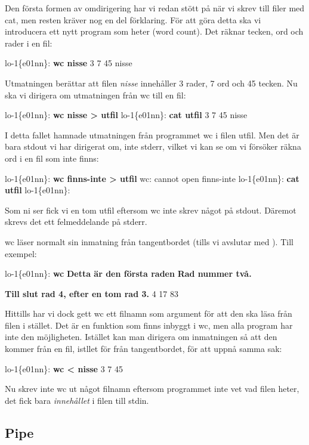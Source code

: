 \documentclass[a4paper,twocolumn]{book}
\begin{document}
Den första formen av omdirigering har vi redan stött på när vi skrev till
filer med cat, men resten kräver nog en del förklaring. För att göra
detta ska vi introducera ett nytt program som heter  (word
count). Det räknar tecken, ord och rader i en fil:
\begin{example}
  lo-1\{e01nn\}: \textbf{wc nisse}
  3       7      45 nisse
\end{example}
Utmatningen berättar att filen \emph{nisse} innehåller 3 rader, 7 ord
och 45 tecken. Nu ska vi dirigera om utmatningen från wc till
en fil:
\begin{example}
  lo-1\{e01nn\}: \textbf{wc nisse > utfil}
  lo-1\{e01nn\}: \textbf{cat utfil}
  3       7      45 nisse
\end{example}
I detta fallet hamnade utmatningen från programmet wc i filen
utfil. Men det är bara stdout vi har dirigerat om, inte stderr, vilket
vi kan se om vi försöker räkna ord i en fil som inte finns:
\begin{example}
  lo-1\{e01nn\}: \textbf{wc finns-inte > utfil}
  wc: cannot open finns-inte
  lo-1\{e01nn\}: \textbf{cat utfil}
  lo-1\{e01nn\}:
\end{example}
Som ni ser fick vi en tom utfil eftersom wc inte skrev något på
stdout. Däremot skrevs det ett felmeddelande på stderr.

wc läser normalt sin inmatning från tangentbordet (tills vi avslutar
med ). Till exempel:
\begin{example}
  lo-1\{e01nn\}: \textbf{wc}
  \textbf{Detta är den första raden}
  \textbf{Rad nummer två.}

  \textbf{Till slut rad 4, efter en tom rad 3.}
  \textbf{}
  4      17      83
\end{example}

Hittills har vi dock gett wc ett filnamn som argument för att den ska
läsa från filen i stället. Det är en funktion som finns inbyggt i wc,
men alla program har inte den möjligheten. Istället kan man dirigera
om inmatningen så att den kommer från en fil, istllet för från
tangentbordet, för att uppnå samma sak:
\begin{example}
  lo-1\{e01nn\}: \textbf{wc < nisse}
  3       7      45
\end{example}
Nu skrev inte wc ut något filnamn eftersom programmet inte vet
vad filen heter, det fick bara \emph{innehållet} i filen till stdin.

\subsection{Pipe}
\end{document}
